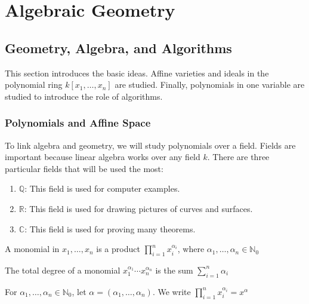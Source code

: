 \documentclass[crop=false,class=article,oneside]{standalone}
\begin{document}
    \ifx\ifsub\undefined
        \section*{Algebraic Geometry}
        \setcounter{section}{1}
    \fi
    \subsection{Geometry, Algebra, and Algorithms}
        This section introduces the basic ideas. Affine
        varieties and ideals in the polynomial ring
        $k[x_1,\hdots,x_n]$ are studied. Finally, polynomials
        in one variable are studied to introduce the role
        of algorithms.
        \subsubsection{Polynomials and Affine Space}
            To link algebra and geometry, we will study
            polynomials over a field. Fields are important
            because linear algebra works over any field $k$.
            There are three particular fields that will
            be used the most:
            \begin{enumerate}
                \item $\mathbb{Q}$: This field is used
                      for computer examples.
                \item $\mathbb{R}$: This field is used
                      for drawing pictures of curves and surfaces.
                \item $\mathbb{C}$: This field is used
                      for proving many theorems.
            \end{enumerate}
            \begin{definition}
                A monomial in $x_1,\hdots,x_n$ is a product
                $\prod_{i=1}^{n}x_{i}^{\alpha_{i}}$, where
                $\alpha_{1},\hdots,\alpha_{n}\in\mathbb{N}_0$
            \end{definition}
            \begin{definition}
                The total degree of a monomial
                $x_1^{\alpha_1}\cdots x_n^{\alpha_n}$ is
                the sum $\sum_{i=1}^{n}\alpha_{i}$
            \end{definition}
            \begin{notation}
                For $\alpha_1,\hdots,\alpha_n\in\mathbb{N}_0$,
                let $\alpha=(\alpha_1,\hdots,\alpha_n)$.
                We write
                $\prod_{i=1}^{n}x_{i}^{\alpha_{i}}=x^{\alpha}$
            \end{notation}
\end{document}
